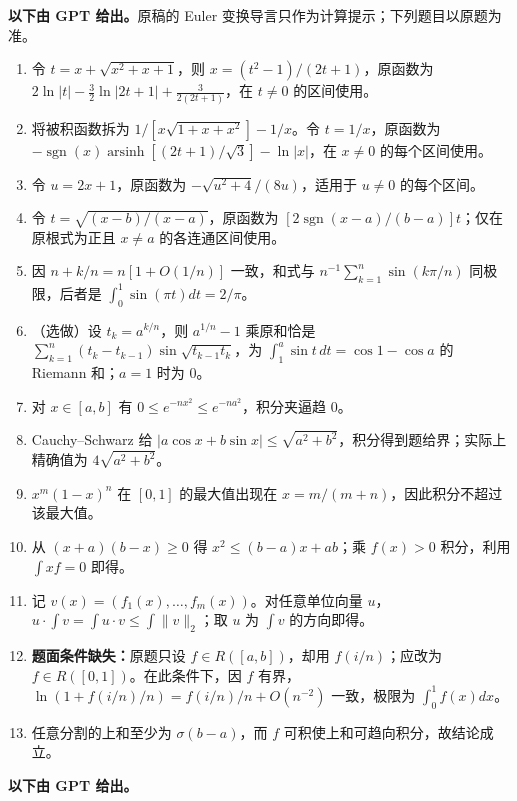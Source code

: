 \noindent\textbf{以下由 GPT 给出。}原稿的 Euler 变换导言只作为计算提示；下列题目以原题为准。
\begin{enumerate}
\item 令 $t=x+\sqrt{x^2+x+1}$，则 $x=(t^2-1)/(2t+1)$，原函数为 $2\ln|t|-\frac32\ln|2t+1|+\frac3{2(2t+1)}$，在 $t\ne0$ 的区间使用。
\item 将被积函数拆为 $1/[x\sqrt{1+x+x^2}]-1/x$。令 $t=1/x$，原函数为 $-\operatorname{sgn}(x)\operatorname{arsinh}[(2t+1)/\sqrt3]-\ln|x|$，在 $x\ne0$ 的每个区间使用。
\item 令 $u=2x+1$，原函数为 $-\sqrt{u^2+4}/(8u)$，适用于 $u\ne0$ 的每个区间。
\item 令 $t=\sqrt{(x-b)/(x-a)}$，原函数为 $[2\operatorname{sgn}(x-a)/(b-a)]t$；仅在原根式为正且 $x\ne a$ 的各连通区间使用。
\item 因 $n+k/n=n[1+O(1/n)]$ 一致，和式与 $n^{-1}\sum_{k=1}^n\sin(k\pi/n)$ 同极限，后者是 $\int_0^1\sin(\pi t)dt=2/\pi$。
\item（选做）设 $t_k=a^{k/n}$，则 $a^{1/n}-1$ 乘原和恰是 $\sum_{k=1}^n(t_k-t_{k-1})\sin\sqrt{t_{k-1}t_k}$，为 $\int_1^a\sin t\,dt=\cos1-\cos a$ 的 Riemann 和；$a=1$ 时为 $0$。
\item 对 $x\in[a,b]$ 有 $0\le e^{-nx^2}\le e^{-na^2}$，积分夹逼趋 $0$。
\item Cauchy--Schwarz 给 $|a\cos x+b\sin x|\le\sqrt{a^2+b^2}$，积分得到题给界；实际上精确值为 $4\sqrt{a^2+b^2}$。
\item $x^m(1-x)^n$ 在 $[0,1]$ 的最大值出现在 $x=m/(m+n)$，因此积分不超过该最大值。
\item 从 $(x+a)(b-x)\ge0$ 得 $x^2\le(b-a)x+ab$；乘 $f(x)>0$ 积分，利用 $\int xf=0$ 即得。
\item 记 $v(x)=(f_1(x),\ldots,f_m(x))$。对任意单位向量 $u$，$u\cdot\int v=\int u\cdot v\le\int\lVert{} v\rVert_2$；取 $u$ 为 $\int v$ 的方向即得。
\item \textbf{题面条件缺失：}原题只设 $f\in R([a,b])$，却用 $f(i/n)$；应改为 $f\in R([0,1])$。在此条件下，因 $f$ 有界，$\ln(1+f(i/n)/n)=f(i/n)/n+O(n^{-2})$ 一致，极限为 $\int_0^1f(x)dx$。
\item 任意分割的上和至少为 $\sigma(b-a)$，而 $f$ 可积使上和可趋向积分，故结论成立。
\end{enumerate}
\noindent\textbf{以下由 GPT 给出。}
